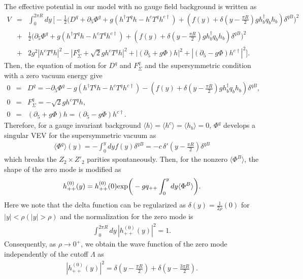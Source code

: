 \documentclass[a4paper,12pt]{article}
\begin{document}
The effective potential in our model with no gauge field background 
is written as 
\begin{eqnarray}
V&=&\int^{2\pi R}_0 dy\,\bigg[-\frac{1}{2}\bigg(D^q+\partial_5\Phi^q
+g(h^\dagger T^q h-h^c T^q h^{c\dagger})
+(f(y)+\delta(y-\frac{\pi R}{2})gh^\dagger_b q_b h_b)
\delta^{qB}\bigg)^2\nonumber \\
&+&\frac{1}{2}\bigg(\partial_5\Phi^q
+g(h^\dagger T^q h-h^c T^q h^{c\dagger})
+(f(y)+\delta(y-\frac{\pi R}{2})gh^\dagger_b q_b h_b)
\delta^{qB}\bigg)^2 \nonumber \\
&+&2g^2|h^cT^q h|^2-|F^q_\Sigma+\sqrt{2}gh^c T^q h|^2
+|(\partial_5+g\Phi)h|^2+|(\partial_5-g\Phi)h^{c\dagger}|^2\bigg].
\end{eqnarray}
Then, the equation of motion for $D^q$ and $F^q_\Sigma$ and 
the supersymmetric condition with a zero vacuum energy give
\begin{eqnarray}
0&=&D^q=-\partial_5\Phi^q
-g(h^\dagger T^q h-h^c T^q h^{c\dagger})
-(f(y)+\delta(y-\frac{\pi R}{2})gh^\dagger_b q_b h_b)\delta^{qB}, \\ 
0&=&F^q_\Sigma=-\sqrt{2}gh^cT^q h, \\  
0&=&(\partial_5+g\Phi)h=(\partial_5-g\Phi)h^{c\dagger}.
\end{eqnarray} 
Therefore, for a gauge invariant background   
$\langle h\rangle=\langle h^c\rangle=\langle h_b\rangle=0$, 
$\Phi^q$ develops a singular VEV for the 
supersymmetric vacuum as
\begin{eqnarray}
\langle\Phi^q\rangle(y)=-\int^y_0 
dy f(y)\delta^{qB}=-c\,\delta'(y-\frac{\pi R}{2})\delta^{qB}
\end{eqnarray}
which breaks the $Z_2\times Z'_2$ parities spontaneously. 
Then, for the nonzero $\langle\Phi^B\rangle$, 
the shape of the zero mode is modified as
\begin{eqnarray}
h^{(0)}_{++}(y)=h^{(0)}_{++}(0)
{\rm exp}\bigg(-gq_{++}\int^y_0 dy \langle\Phi^B\rangle\bigg).
\end{eqnarray} 
Here we note that the delta function can be regularized as 
$\delta(y)=\frac{1}{2\rho}(0)$ for
$|y|<\rho(|y|>\rho)$ and the normalization for the zero mode is 
\begin{eqnarray}
\int^{2\pi R}_0 dy\,|h^{(0)}_{++}(y)|^2=1.
\end{eqnarray}
Consequently, as $\rho\rightarrow 0^+$, 
we obtain the wave function of the zero mode independently of the 
cutoff $\Lambda$ as 
\begin{eqnarray}
|h^{(0)}_{++}(y)|^2=\delta(y-\frac{\pi R}{2})+\delta(y-\frac{3\pi R}{2}).
\end{eqnarray}
\end{document}
